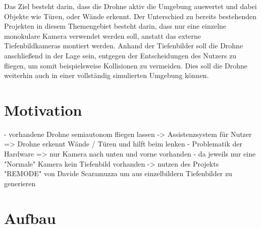 Das Ziel besteht darin, dass die Drohne aktiv die Umgebung auswertet und dabei Objekte wie Türen, oder Wände erkennt. Der Unterschied zu bereits bestehenden Projekten in diesem Themengebiet besteht darin, dass nur eine einzelne monokulare Kamera verwendet werden soll, anstatt das externe Tiefenbildkameras montiert werden. \newline
Anhand der Tiefenbilder soll die Drohne anschließend in der Lage sein, entgegen der Entscheidungen des Nutzers zu fliegen, um somit beispielsweise Kollisionen zu vermeiden. \newline
Dies soll die Drohne weiterhin auch in einer vollständig simulierten Umgebung können.


\section{Motivation}

- vorhandene Drohne semiautonom fliegen lassen
-> Assistenzsystem für Nutzer => Drohne erkennt Wände / Türen und hilft beim lenken
- Problematik der Hardware => nur Kamera nach unten und vorne vorhanden
- da jeweils nur eine "Normale" Kamera kein Tiefenbild vorhanden
-> nutzen des Projekts "REMODE" von Davide Scaramuzza um aus einzelbildern Tiefenbilder zu generieren


\section{Aufbau}
